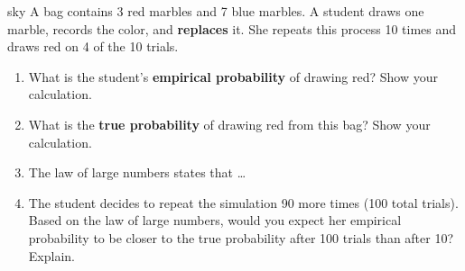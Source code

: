 \documentclass[10pt]{article}
\begin{document}
\namedateperiod

\vspace{0.14in}

\begin{scenariobox}[Context]{sky}
\small
A bag contains 3 red marbles and 7 blue marbles. A student draws one marble,
records the color, and \textbf{replaces} it. She repeats this process 10 times
and draws red on 4 of the 10 trials.
\end{scenariobox}

\vspace{0.1in}

\begin{practicebox}
\small
\begin{enumerate}[leftmargin=1.5em, itemsep=10pt]
  \item What is the student's \textbf{empirical probability} of drawing red?
        Show your calculation.
        \vspace{16pt}

  \item What is the \textbf{true probability} of drawing red from this bag?
        Show your calculation.
        \vspace{16pt}

  \item The law of large numbers states that \ldots{}\\
        \writeline\writeline

  \item The student decides to repeat the simulation 90 more times (100 total trials).
        Based on the law of large numbers, would you expect her empirical probability
        to be closer to the true probability after 100 trials than after 10? Explain.\\
        \writeline\writeline\writeline
\end{enumerate}
\end{practicebox}
\end{document}
